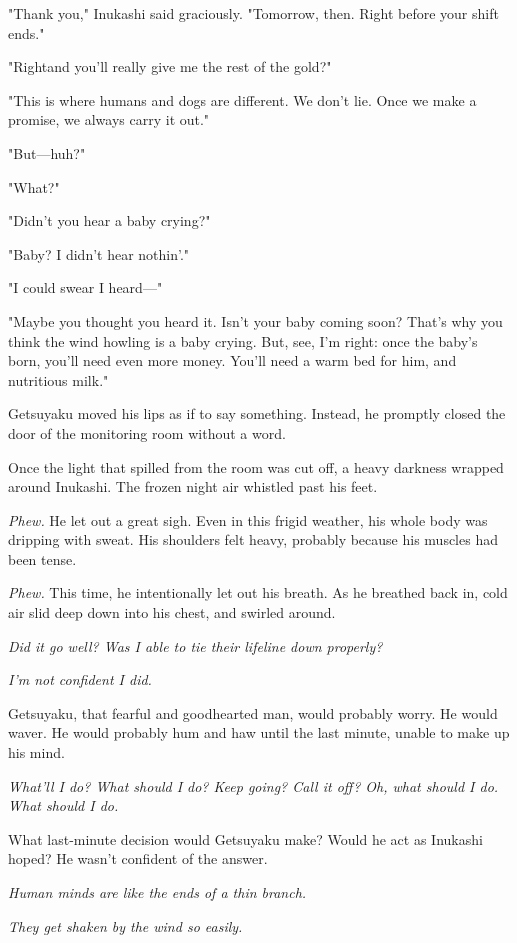 "Thank you," Inukashi said graciously. "Tomorrow, then. Right before
your shift ends."

"Right\el and you'll really give me the rest of the gold?"

"This is where humans and dogs are different. We don't lie. Once we make
a promise, we always carry it out."

"But---huh?"

"What?"

"Didn't you hear a baby crying?"

"Baby? I didn't hear nothin'."

"I could swear I heard---"

"Maybe you thought you heard it. Isn't your baby coming soon? That's why
you think the wind howling is a baby crying. But, see, I'm right: once
the baby's born, you'll need even more money. You'll need a warm bed for
him, and nutritious milk."

Getsuyaku moved his lips as if to say something. Instead, he promptly
closed the door of the monitoring room without a word.

Once the light that spilled from the room was cut off, a heavy darkness
wrapped around Inukashi. The frozen night air whistled past his feet.

\emph{Phew.} He let out a great sigh. Even in this frigid weather, his whole
body was dripping with sweat. His shoulders felt heavy, probably because
his muscles had been tense.

\emph{Phew.} This time, he intentionally let out his breath. As he breathed
back in, cold air slid deep down into his chest, and swirled around.

\emph{Did it go well? Was I able to tie their lifeline down properly?}

\emph{I'm not confident I did.}

Getsuyaku, that fearful and goodhearted man, would probably worry. He
would waver. He would probably hum and haw until the last minute, unable
to make up his mind.

\emph{What'll I do? What should I do? Keep going? Call it off? Oh, what should
I do. What should I do.}

What last-minute decision would Getsuyaku make? Would he act as Inukashi
hoped? He wasn't confident of the answer.

\emph{Human minds are like the ends of a thin branch.}

\emph{They get shaken by the wind so easily.}

